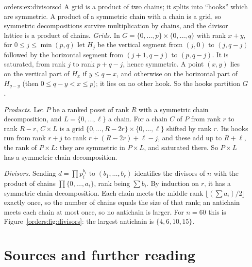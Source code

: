 \begin{solution}{orders:ex:divisorscd}
\idea A grid is a product of two chains; it splits into ``hooks'' which are symmetric. A product of a symmetric chain with a chain
is a grid, so symmetric decompositions survive multiplication by chains, and the divisor lattice is a product of chains.
\writeup \emph{Grids.} In $G=\{0,\dots,p\}\times\{0,\dots,q\}$ with rank $x+y$, for $0\le j\le\min(p,q)$ let $H_j$ be the vertical segment from $(j,0)$ to $(j,q-j)$
followed by the horizontal segment from $(j+1,q-j)$ to $(p,q-j)$. It is saturated, from rank $j$ to rank $p+q-j$, hence symmetric. A
point $(x,y)$ lies on the vertical part of $H_x$ if $y\le q-x$, and otherwise on the horizontal part of $H_{q-y}$ (then $0\le q-y<x\le p$); it
lies on no other hook. So the hooks partition $G$.

\emph{Products.} Let $P$ be a ranked poset of rank $R$ with a symmetric chain decomposition, and $L=\{0,\dots,\ell\}$ a chain. For a chain $C$
of $P$ from rank $r$ to rank $R-r$, $C\times L$ is a grid $\{0,\dots,R-2r\}\times\{0,\dots,\ell\}$ shifted by rank $r$. Its hooks run from rank $r+j$ to rank
$r+(R-2r)+\ell-j$, and these add up to $R+\ell$, the rank of $P\times L$: they are symmetric in $P\times L$, and saturated there. So $P\times L$ has a
symmetric chain decomposition.

\emph{Divisors.} Sending $d=\prod p_i^{b_i}$ to $(b_1,\dots,b_r)$ identifies the divisors of $n$ with the product of chains $\prod\{0,\dots,a_i\}$, rank being
$\sum b_i$. By induction on $r$, it has a symmetric chain decomposition. Each chain meets the middle rank $\lfloor(\sum a_i)/2\rfloor$ exactly
once, so the number of chains equals the size of that rank; an antichain meets each chain at most once, so no antichain is
larger. For $n=60$ this is Figure~\ref{orders:fig:divisors}: the largest antichain is $\{4,6,10,15\}$.
\end{solution}

\section*{Sources and further reading}

